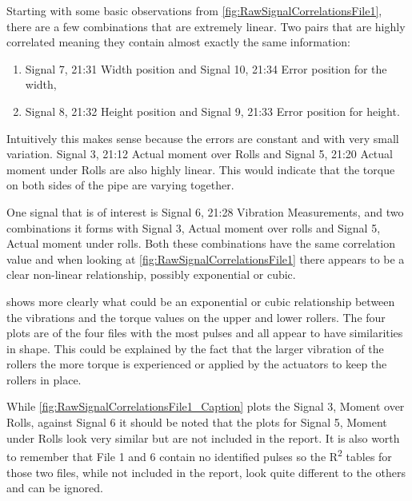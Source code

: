 \documentclass[]{article}
\begin{document}
Starting with some basic observations from \cref{fig:RawSignalCorrelationsFile1}, there are a few combinations that are extremely linear. Two pairs that are highly correlated meaning they contain almost exactly the same information:
\begin{enumerate}
\item Signal 7, 21:31 Width position and Signal 10, 21:34 Error position for the width, 
\item Signal 8, 21:32 Height position and Signal 9, 21:33 Error position for height.
\end{enumerate}
Intuitively this makes sense because the errors are constant and with very small variation. Signal 3, 21:12 Actual moment over Rolls and Signal 5, 21:20 Actual moment under Rolls are also highly linear. This would indicate that the torque on both sides of the pipe are varying together.

One signal that is of interest is Signal 6, 21:28 Vibration Measurements, and two combinations it forms with Signal 3, Actual moment over rolls and Signal 5, Actual moment under rolls. Both these combinations have the same correlation value and when looking at \cref{fig:RawSignalCorrelationsFile1} there appears to be a clear non-linear relationship, possibly exponential or cubic.

 shows more clearly what could be an exponential or cubic relationship between the vibrations and the torque values on the upper and lower rollers. The four plots are of the four files with the most pulses and all appear to have similarities in shape. This could be explained by the fact that the larger vibration of the rollers the more torque is experienced or applied by the actuators to keep the rollers in place.

While \cref{fig:RawSignalCorrelationsFile1_Caption} plots the Signal 3, Moment over Rolls, against Signal 6 it should be noted that the plots for Signal 5, Moment under Rolls look very similar but are not included in the report. It is also worth to remember that File 1 and 6 contain no identified pulses so the R\textsuperscript{2} tables for those two files, while not included in the report, look quite different to the others and can be ignored.

\begin{center}
\begin{scriptsize}
 
\end{scriptsize}
\label{correlationTable}
\end{center}
\end{document}
